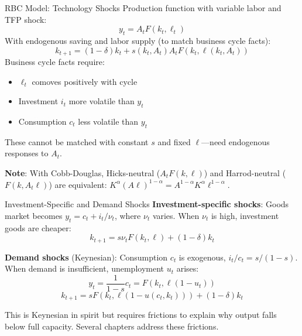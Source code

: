 \documentclass[blue]{beamer}
\begin{document}
\begin{frame}{RBC Model: Technology Shocks}
	Production function with variable labor and TFP shock:
	\[
	y_t = A_t F(k_t, \ell_t)
	\]
	With endogenous saving and labor supply (to match business cycle facts):
	\[
	k_{t+1} = (1-\delta)k_t + s(k_t, A_t) A_t F(k_t, \ell(k_t, A_t))
	\]
	Business cycle facts require:
	\vspace{-6pt}
	\begin{itemize}
		\item $\ell_t$ comoves positively with cycle
		\item Investment $i_t$ more volatile than $y_t$
		\item Consumption $c_t$ less volatile than $y_t$
	\end{itemize}
	
	These cannot be matched with constant $s$ and fixed $\ell$---need endogenous responses to $A_t$.
	
	\textbf{Note}: With Cobb-Douglas, Hicks-neutral ($A_t F(k,\ell)$) and Harrod-neutral ($F(k, A_t \ell)$) are equivalent: $K^\alpha(A\ell)^{1-\alpha} = A^{1-\alpha}K^\alpha\ell^{1-\alpha}$.
\end{frame}

\begin{frame}{Investment-Specific and Demand Shocks}
	\textbf{Investment-specific shocks}: Goods market becomes $y_t = c_t + i_t/\nu_t$, where $\nu_t$ varies. When $\nu_t$ is high, investment goods are cheaper:
	\[
	k_{t+1} = s\nu_t F(k_t, \ell) + (1-\delta)k_t
	\]
	
	\bigskip
	\textbf{Demand shocks} (Keynesian): Consumption $c_t$ is exogenous, $i_t/c_t = s/(1-s)$. When demand is insufficient, unemployment $u_t$ arises:
	\[
	y_t = \frac{1}{1-s}c_t = F(k_t, \ell(1-u_t))
	\]
	\[
	k_{t+1} = sF(k_t, \ell(1-u(c_t, k_t))) + (1-\delta)k_t
	\]
	
	This is Keynesian in spirit but requires frictions to explain why output falls below full capacity. Several chapters address these frictions.
\end{frame}
\end{document}
